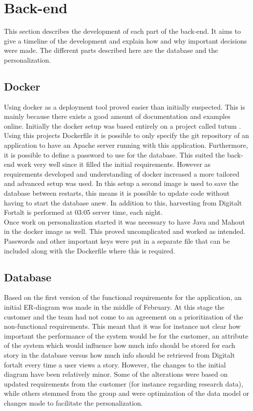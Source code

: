 \section{Back-end}

This section describes the development of each part of the back-end. It aims to give a timeline of the development and explain how and why important decisions were made. The different parts described here are the database and the personalization.  

\subsection{Docker}

Using docker as a deployment tool proved easier than initially suspected. This is mainly because there exists a good amount of documentation and examples online. Initially the docker setup was based entirely on a project called tutum \cite{EHW3}. Using this projects Dockerfile it is possible to only specify the git repository of an application to have an Apache server running with this application. Furthermore, it is possible to define a password to use for the database. This suited the back-end work very well since it filled the initial requirements. However as requirements developed and understanding of docker increased a more tailored and advanced setup was used. In this setup a second image is used to save the database between restarts, this means it is possible to update code without having to start the database anew. In addition to this, harvesting from Digitalt Fortalt is performed at 03:05 server time, each night. \\

Once work on personalization started it was necessary to have Java and Mahout in the docker image as well. This proved uncomplicated and worked as intended. Passwords and other important keys were put in a separate file that can be included along with the Dockerfile where this is required.

\subsection{Database}

Based on the first version of the functional requirements for the application, an initial ER-diagram was made in the middle of February. At this stage the customer and the team had not come to an agreement on a prioritization of the non-functional requirements. This meant that it was for instance not clear how important the performance of the system would be for the customer, an attribute of the system which would influence how much info should be stored for each story in the database versus how much info should be retrieved from Digitalt fortalt every time a user views a story. However, the changes to the initial diagram have been relatively minor. Some of the alterations were based on updated requirements from the customer (for instance regarding research data), while others stemmed from the group and were optimization of the data model or changes made to facilitate the personalization.\newline

